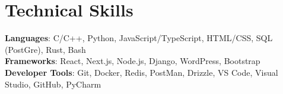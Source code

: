 \documentclass[letterpaper,11pt]{article}
\makeatletter
\newcommand{\resumeItem}[1]{
  \item\small{
    {#1 \vspace{-2pt}}
  }
}
\newcommand{\resumeSubheading}[4]{
  \vspace{-2pt}\item
    \begin{tabular*}{0.97\textwidth}[t]{l@{\extracolsep{\fill}}r}
      \textbf{#1} & #2 \\
      \textit{\small#3} & \textit{\small #4} \\
    \end{tabular*}\vspace{-7pt}
}
\newcommand{\resumeSubSubheading}[2]{
    \item
    \begin{tabular*}{0.97\textwidth}{l@{\extracolsep{\fill}}r}
      \textit{\small#1} & \textit{\small #2} \\
    \end{tabular*}\vspace{-7pt}
}
\newcommand{\resumeSubHeadingListEnd}{\end{itemize}}
\newcommand{\resumeItemListStart}{\begin{itemize}}
\newcommand{\resumeItemListEnd}{\end{itemize}\vspace{-5pt}}
\makeatother
\begin{document}




%
\section{Technical Skills}
 \vspace{4pt}
 \begin{itemize}[leftmargin=0.15in, label={}]
    \small{\item{
     \textbf{Languages}{: C/C++, Python, JavaScript/TypeScript, HTML/CSS, SQL (PostGre), Rust, Bash} \\ \vspace{2pt}
     \textbf{Frameworks}{: React, Next.js, Node.js, Django, WordPress, Bootstrap} \\ \vspace{2pt}
     \textbf{Developer Tools}{: Git, Docker, Redis, PostMan, Drizzle, VS Code, Visual Studio, GitHub, PyCharm} \\
    }}
 \end{itemize}
\end{document}

